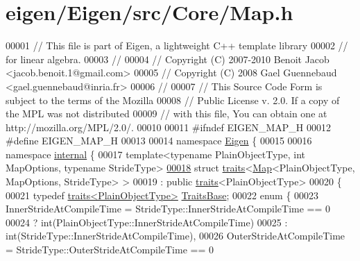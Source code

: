 \hypertarget{eigen_2_eigen_2src_2_core_2_map_8h_source}{}\section{eigen/\+Eigen/src/\+Core/\+Map.h}
\label{eigen_2_eigen_2src_2_core_2_map_8h_source}

\begin{DoxyCode}
00001 \textcolor{comment}{// This file is part of Eigen, a lightweight C++ template library}
00002 \textcolor{comment}{// for linear algebra.}
00003 \textcolor{comment}{//}
00004 \textcolor{comment}{// Copyright (C) 2007-2010 Benoit Jacob <jacob.benoit.1@gmail.com>}
00005 \textcolor{comment}{// Copyright (C) 2008 Gael Guennebaud <gael.guennebaud@inria.fr>}
00006 \textcolor{comment}{//}
00007 \textcolor{comment}{// This Source Code Form is subject to the terms of the Mozilla}
00008 \textcolor{comment}{// Public License v. 2.0. If a copy of the MPL was not distributed}
00009 \textcolor{comment}{// with this file, You can obtain one at http://mozilla.org/MPL/2.0/.}
00010 
00011 \textcolor{preprocessor}{#ifndef EIGEN\_MAP\_H}
00012 \textcolor{preprocessor}{#define EIGEN\_MAP\_H}
00013 
00014 \textcolor{keyword}{namespace }\hyperlink{namespace_eigen}{Eigen} \{ 
00015 
00016 \textcolor{keyword}{namespace }\hyperlink{namespaceinternal}{internal} \{
00017 \textcolor{keyword}{template}<\textcolor{keyword}{typename} PlainObjectType, \textcolor{keywordtype}{int} MapOptions, \textcolor{keyword}{typename} Str\textcolor{keywordtype}{id}eType>
\hyperlink{struct_eigen_1_1internal_1_1traits_3_01_map_3_01_plain_object_type_00_01_map_options_00_01_stride_type_01_4_01_4}{00018} \textcolor{keyword}{struct }\hyperlink{struct_eigen_1_1internal_1_1traits}{traits}<\hyperlink{group___core___module_class_eigen_1_1_map}{Map}<PlainObjectType, MapOptions, StrideType> >
00019   : \textcolor{keyword}{public} \hyperlink{struct_eigen_1_1internal_1_1traits}{traits}<PlainObjectType>
00020 \{
00021   \textcolor{keyword}{typedef} \hyperlink{struct_eigen_1_1internal_1_1traits}{traits<PlainObjectType>} \hyperlink{struct_eigen_1_1internal_1_1traits}{TraitsBase};
00022   \textcolor{keyword}{enum} \{
00023     InnerStrideAtCompileTime = StrideType::InnerStrideAtCompileTime == 0
00024                              ? int(PlainObjectType::InnerStrideAtCompileTime)
00025                              : int(StrideType::InnerStrideAtCompileTime),
00026     OuterStrideAtCompileTime = StrideType::OuterStrideAtCompileTime == 0

\end{DoxyCode}
